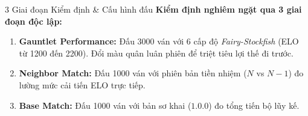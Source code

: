 \begin{frame}{3 Giai đoạn Kiểm định \& Cấu hình đấu}
    \textbf{Kiểm định nghiêm ngặt qua 3 giai đoạn độc lập:}
    \vspace{0.2cm}
    \begin{enumerate}
        \item<1-> \textbf{Gauntlet Performance:} Đấu 3000 ván với 6 cấp độ \textit{Fairy-Stockfish} (ELO từ 1200 đến 2200). Đổi màu quân luân phiên để triệt tiêu lợi thế đi trước.
        \item<2-> \textbf{Neighbor Match:} Đấu 1000 ván với phiên bản tiền nhiệm ($N$ vs $N-1$) đo lường mức cải tiến ELO trực tiếp.
        \item<3-> \textbf{Base Match:} Đấu 1000 ván với bản sơ khai ($1.0.0$) đo tổng tiến bộ lũy kế.
    \end{enumerate}
    
    \vspace{0.4cm}
\end{frame}

